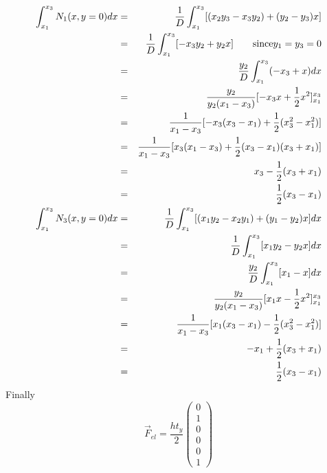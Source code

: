 \begin{eqnarray}
\int_{x_1}^{x_3} N_1(x,y=0) dx 
&=& \frac{1}{D} \int_{x_1}^{x_3} [(x_2y_3-x_3y_2) + (y_2-y_3)x ] \nonumber\\
&=& \frac{1}{D} \int_{x_1}^{x_3} [-x_3y_2 + y_2 x ] \qquad \text{since} y_1=y_3=0 \nonumber\\
&=& \frac{y_2}{D} \int_{x_1}^{x_3} (-x_3 +  x ) dx \nonumber\\
&=& \frac{y_2}{y_2(x_1-x_3)  } [ -x_3 x + \frac{1}{2}x^2]_{x_1}^{x_3} \nonumber\\ 
&=& \frac{1}{x_1-x_3 } [ -x_3 (x_3-x_1) + \frac{1}{2}(x_3^2-x_1^2)] \nonumber\\
&=& \frac{1}{x_1-x_3 } [ x_3 (x_1-x_3) + \frac{1}{2}(x_3-x_1)(x_3+x_1)] \nonumber\\
&=&  x_3 - \frac{1}{2}(x_3+x_1) \nonumber\\
&=&  \frac{1}{2} (x_3-x_1) \\
\int_{x_1}^{x_3} N_3(x,y=0) dx
&=& \frac{1}{D} \int_{x_1}^{x_3}    [(x_1y_2-x_2y_1) + (y_1-y_2)x ] dx \nonumber\\
&=& \frac{1}{D} \int_{x_1}^{x_3}    [x_1y_2 - y_2x ] dx \nonumber\\
&=& \frac{y_2}{D} \int_{x_1}^{x_3}    [x_1 - x ] dx \nonumber\\
&=& \frac{y_2}{y_2(x_1-x_3) } [x_1 x - \frac{1}{2} x^2]_{x_1}^{x_3}  \nonumber\\
&=& \frac{1}{x_1-x_3} [x_1 (x_3-x_1) - \frac{1}{2} (x_3^2-x_1^2)] \nonumber\\
&=& -x_1  + \frac{1}{2} (x_3+ x_1) \nonumber\\
&=& \frac{1}{2}( x_3 -x_1 )
\end{eqnarray}
Finally
\[
\vec{F}_{el}=
\frac{h t_y}{2}
\left(
\begin{array}{c}
0\\
1 \\
0\\
0\\
0\\
1 
\end{array}
\right)
\]





